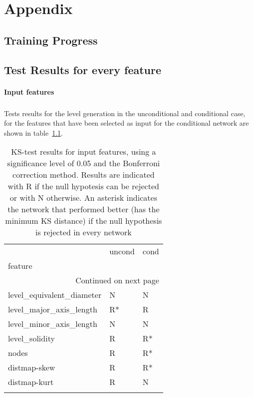 \chapter{Appendix}
\section{Training Progress}


\section{Test Results for every feature}
\subsubsection{Input features}
\paragraph{} Tests results for the level generation in the unconditional and conditional case, for the features that have been selected as input for the conditional network are shown in table~\ref{tab:results-input-features}.
\begin{longtable}{lll}
	\caption[Test results for input features]{ \small KS-test results for input features, using a significance level of 0.05 and the Bonferroni correction method. Results are indicated with R if the null hypotesis can be rejected or with N otherwise. An asterisk indicates the network that performed better (has the minimum KS distance) if the null hypothesis is rejected in every network}\\
	\toprule
	{} & uncond & cond \\
	feature                   &        &      \\
	\midrule
	\endhead
	\midrule
	\multicolumn{3}{r}{{Continued on next page}} \\
	\midrule
	\endfoot
	
	\bottomrule
	\endlastfoot
	level\_equivalent\_diameter &      N &    N \\
	level\_major\_axis\_length   &     R* &    R \\
	level\_minor\_axis\_length   &      N &    N \\
	level\_solidity            &      R &   R* \\
	nodes                     &      R &   R* \\
	distmap-skew              &      R &   R* \\
	distmap-kurt              &      R &    N \\
	\label{tab:results-input-features}
\end{longtable}

